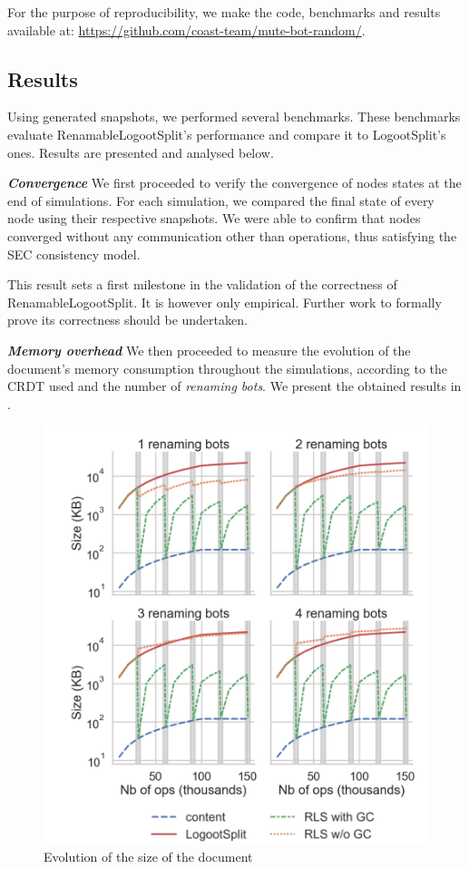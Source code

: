\documentclass[10pt,journal,compsoc]{IEEEtran}
\let\MYoriglatexcaption\caption
\renewcommand{\caption}[2][\relax]{\MYoriglatexcaption[#2]{#2}}
\newcommand{\headerparagraph}[1]{\textbf{\emph{#1}}\quad}
\begin{document}
For the purpose of reproducibility, we make the code, benchmarks and results available at: \url{https://github.com/coast-team/mute-bot-random/}.

\subsection{Results}
\label{sec:evaluation-results}

Using generated snapshots, we performed several benchmarks.
These benchmarks evaluate RenamableLogootSplit's performance and compare it to LogootSplit's ones.
Results are presented and analysed below.

\headerparagraph{Convergence}
%
We first proceeded to verify the convergence of nodes states at the end of simulations.
For each simulation, we compared the final state of every node using their respective snapshots.
We were able to confirm that nodes converged without any communication other than operations, thus satisfying the \ac{SEC} consistency model.

This result sets a first milestone in the validation of the correctness of RenamableLogootSplit.
It is however only empirical.
Further work to formally prove its correctness should be undertaken.

\headerparagraph{Memory overhead}
%
We then proceeded to measure the evolution of the document's memory consumption throughout the simulations, according to the CRDT used and the number of \emph{renaming bots}.
We present the obtained results in .

\begin{figure}[!ht]
    \centering
    \includegraphics[width=0.9\columnwidth]{img/snapshot-sizes-alt-legende-v2.png}
    \caption{Evolution of the size of the document}
    \label{fig:evolution-document-size}
\end{figure}
\end{document}
